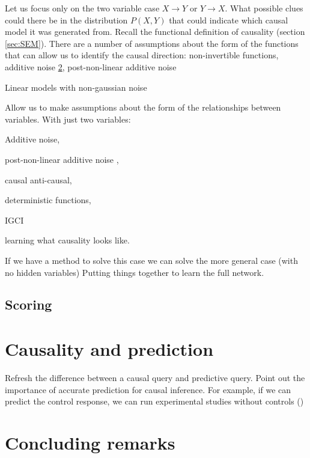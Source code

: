 \documentclass[11pt,a4paper]{article}
\begin{document}
Let us focus only on the two variable case $X \rightarrow Y$ or $Y \rightarrow X$. What possible clues could there be in the distribution $P(X,Y)$ that could indicate which causal model it was generated from. Recall the functional definition of causality (section \ref{sec:SEM}). There are a number of assumptions about the form of the functions that can allow us to identify the causal direction: non-invertible functions, additive noise \ref{}, post-non-linear additive noise 


Linear models with non-gaussian noise \cite{Hoyer2012}

Allow us to make assumptions about the form of the relationships between variables.
With just two variables:

Additive noise, \cite{Hoyer2009}

post-non-linear additive noise \cite{Zhang2008a}, 

causal anti-causal, 

deterministic functions,

IGCI \cite{Janzing2012a}

learning what causality looks like.

If we have a method to solve this case we can solve the more general case (with no hidden variables) Putting things together to learn the full network. 


\subsection{Scoring}


\section{Causality and prediction}
Refresh the difference between a causal query and predictive query.
Point out the importance of accurate prediction for causal inference. For example, if we can predict the control response, we can run experimental studies without controls (\cite{Brodersen2013})

\section{Concluding remarks}
\end{document}
